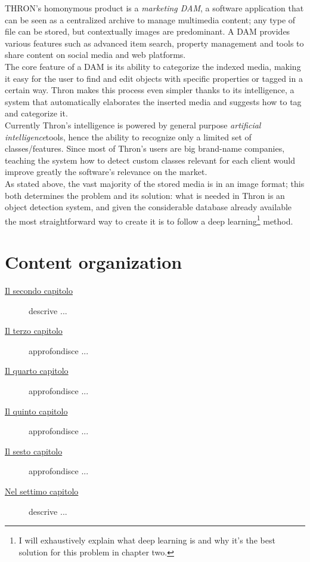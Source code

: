 THRON's homonymous product is a \emph{marketing DAM}, a software application that can be seen as a centralized archive to manage multimedia content; any type of file can be stored, but contextually images are predominant. A DAM provides various features such as advanced item search, property management and tools to share content on social media and web platforms. \\
The core feature of a DAM is its ability to categorize the indexed media, making it easy for the user to find and edit objects with specific properties or tagged in a certain way. Thron makes this process even simpler thanks to its intelligence, a system that automatically elaborates the inserted media and suggests how to tag and categorize it. \\
Currently Thron's intelligence is powered by general purpose \emph{\gls{artificial intelligence}}\glsfirstoccur tools, hence the ability to recognize only a limited set of classes/features. Since most of Thron's users are big brand-name companies, teaching the system how to detect custom classes relevant for each client would improve greatly the software's relevance on the market. \\
As stated above, the vast majority of the stored media is in an image format; this both determines the problem and its solution: what is needed in Thron is an object detection system, and given the considerable database already available the most straightforward way to create it is to follow a deep learning\footnote{I will exhaustively explain what deep learning is and why it's the best solution for this problem in chapter two.} method.



\section{Content organization}

\begin{description}
    \item[{\hyperref[cap:processi-metodologie]{Il secondo capitolo}}] descrive ...
    
    \item[{\hyperref[cap:descrizione-stage]{Il terzo capitolo}}] approfondisce ...
    
    \item[{\hyperref[cap:analisi-requisiti]{Il quarto capitolo}}] approfondisce ...
    
    \item[{\hyperref[cap:progettazione-codifica]{Il quinto capitolo}}] approfondisce ...
    
    \item[{\hyperref[cap:verifica-validazione]{Il sesto capitolo}}] approfondisce ...
    
    \item[{\hyperref[cap:conclusioni]{Nel settimo capitolo}}] descrive ...
\end{description}


